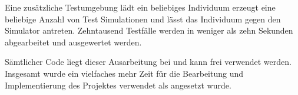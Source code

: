 Eine zusätzliche Testumgebung lädt ein beliebiges Individuum erzeugt eine beliebige Anzahl von Test Simulationen und lässt das Individuum gegen den Simulator antreten. Zehntausend Testfälle werden in weniger als zehn Sekunden abgearbeitet und ausgewertet werden.

Sämtlicher Code liegt dieser Ausarbeitung bei und kann frei verwendet werden. Insgesamt wurde ein vielfaches mehr Zeit für die Bearbeitung und Implementierung des Projektes verwendet als angesetzt wurde.